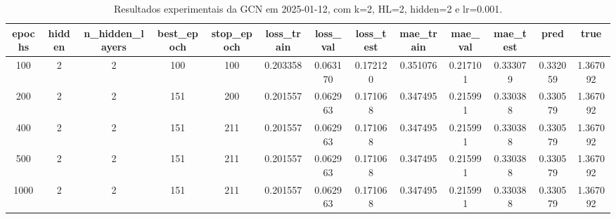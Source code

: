 \begin{table}[h]
\centering
\caption{Resultados experimentais da GCN em 2025-01-12, com k=2, HL=2, hidden=2 e lr=0.001.}
\label{tab:gcn_results_k2_hl2_h2_d20250112}
\begin{tabular}{ccccccccccccc}
\toprule
epochs & hidden & n\_hidden\_layers & best\_epoch & stop\_epoch & loss\_train & loss\_val & loss\_test & mae\_train & mae\_val & mae\_test & pred & true \\
\midrule
100 & 2 & 2 & 100 & 100 & 0.203358 & 0.063170 & 0.172120 & 0.351076 & 0.217101 & 0.333079 & 0.332059 & 1.367092 \\
200 & 2 & 2 & 151 & 200 & 0.201557 & 0.062963 & 0.171068 & 0.347495 & 0.215991 & 0.330388 & 0.330579 & 1.367092 \\
400 & 2 & 2 & 151 & 211 & 0.201557 & 0.062963 & 0.171068 & 0.347495 & 0.215991 & 0.330388 & 0.330579 & 1.367092 \\
500 & 2 & 2 & 151 & 211 & 0.201557 & 0.062963 & 0.171068 & 0.347495 & 0.215991 & 0.330388 & 0.330579 & 1.367092 \\
1000 & 2 & 2 & 151 & 211 & 0.201557 & 0.062963 & 0.171068 & 0.347495 & 0.215991 & 0.330388 & 0.330579 & 1.367092 \\
\bottomrule
\end{tabular}
\end{table}
